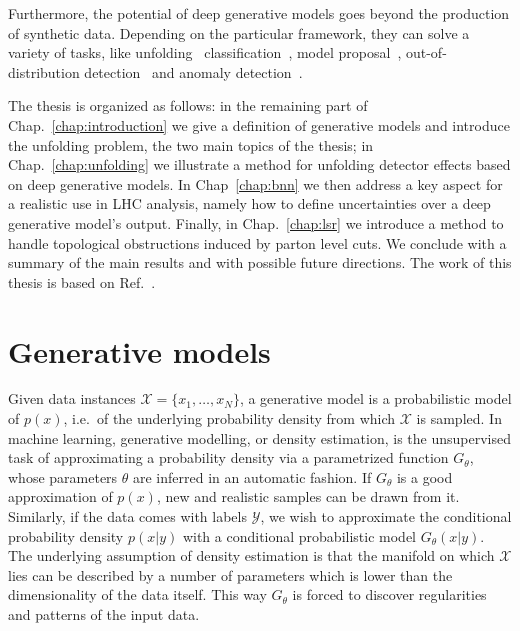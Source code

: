\medskip
Furthermore, the potential of deep generative models goes beyond the production of synthetic data. Depending on the particular framework, they can solve a variety of tasks, like unfolding~\cite{Andreassen:2019cjw, Datta:2018mwd,fcgan} classification~\cite{ardizzone2021training, mackowiak2020generative}, model proposal~\cite{2020ganEFT}, out-of-distribution detection~\cite{nalisnick2019deep, kirichenko2020normalizing, serra2020input, song2019unsupervised} and anomaly detection~\cite{knapp2020adversarially, pol2020anomaly, cheng2021variational, newPhysAnom}. 

The thesis is organized as follows:
in the remaining part of Chap.~\ref{chap:introduction} we give a definition of generative models and introduce the unfolding problem, the two main topics of the thesis; in Chap.~\ref{chap:unfolding} we illustrate a method for unfolding detector effects based on deep generative models. In Chap~\ref{chap:bnn} we then address a key aspect for a realistic use in LHC analysis, namely how to define uncertainties over a deep generative model's output. Finally, in Chap.~\ref{chap:lsr} we introduce a method to handle topological obstructions induced by parton level cuts. We conclude with a summary of the main results and with possible future directions.
The work of this thesis is based on Ref.~\cite{cond_gan, Bellagente:2020piv, Bellagente:2021yyh, LSR}.

\section{Generative models}\label{sec:gmm}
Given data instances $\mathcal{X} = \{ x_1, \ldots , x_N \}$, a generative model is a probabilistic model of $p(x)$, i.e.\ of the underlying probability density from which $\mathcal{X}$ is sampled. 
In machine learning, generative modelling, or density estimation, is the unsupervised task of approximating a probability density via a parametrized function $G_{\theta}$, whose parameters $\theta$ are inferred in an automatic fashion. If $G_{\theta}$ is a good approximation of $p(x)$, new and realistic samples can be drawn from it.
Similarly, if the data comes with labels $\mathcal{Y}$, we wish to approximate the conditional probability density $p(x | y)$ with a conditional probabilistic model $G_{\theta}(x | y)$.
The underlying assumption of density estimation is that the manifold on which $\mathcal{X}$ lies can be described by a number of parameters which is lower than the dimensionality of the data itself. This way $G_{\theta}$ 
is forced to discover regularities and patterns of the input data.

